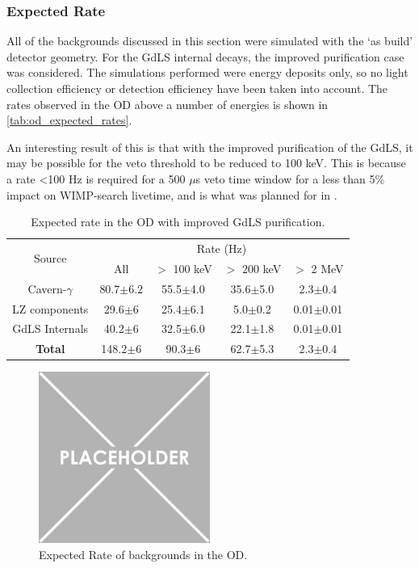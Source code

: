\subsubsection{Expected Rate}
\par
All of the backgrounds discussed in this section were simulated with the `as build' detector geometry.
For the GdLS internal decays, the improved purification case was considered.
The simulations performed were energy deposits only, so no light collection efficiency or detection efficiency have been taken into account.
The rates observed in the OD above a number of energies is shown in \autoref{tab:od_expected_rates}.

\par
An interesting result of this is that with the improved purification of the GdLS, it may be possible for the veto threshold to be reduced to 100 keV.
This is because a rate <100 Hz is required for a 500 $\mu$s veto time window for a less than 5\% impact on WIMP-search livetime, and is what was planned for in \cite{LZ_TechnicalDesignReview_ref}.

\begin{table}[!htbp]
    \centering
    \begin{tabular}{c|c|c|c|c} %
    \hline
    \multirow{2}{*}{Source} & \multicolumn{4}{c}{Rate (Hz)} \\
                            & All          & $>$ 100 keV   & $>$ 200 keV   & $>$ 2 MeV \\ \hline
    Cavern-$\gamma$         & 80.7$\pm$6.2 & 55.5$\pm$4.0  & 35.6$\pm$5.0  & 2.3$\pm$0.4     \\
    LZ components           & 29.6$\pm$6   & 25.4$\pm$6.1  & 5.0$\pm$0.2   & 0.01$\pm$0.01   \\
    GdLS Internals          & 40.2$\pm$6   & 32.5$\pm$6.0  & 22.1$\pm$1.8  & 0.01$\pm$0.01   \\ \hline
    \textbf{Total}          & 148.2$\pm$6  & 90.3$\pm$6    & 62.7$\pm$5.3  & 2.3$\pm$0.4      \\ \hline
    \end{tabular}
    \caption{Expected rate in the OD with improved GdLS purification.}
    \label{tab:od_expected_rates}
\end{table} 

\begin{figure}
    \centering
    \includegraphics[width=0.5\textwidth]{Figures/Placeholder.png}
    \caption{Expected Rate of backgrounds in the OD.}
    \label{fig:OD_estimated_background_rate}
\end{figure}



